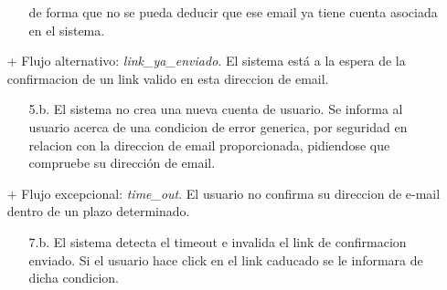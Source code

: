 \documentclass[a4paper]{report}
\begin{document}
\begin{itemize}
\begin{itemize}
                    de forma que no se pueda deducir que ese email ya tiene cuenta asociada en el sistema.
                \end{itemize}
                \item[+] Flujo alternativo: \emph{link\_ya\_enviado}. El sistema est\'a a la espera de la confirmacion de un link valido en esta direccion de email.
                \begin{itemize}
                    \item[5.b.] El sistema no crea una nueva cuenta de usuario. Se informa al usuario acerca de una condicion de error \-{}generica, por seguridad\- en relacion
                    con la direccion de email proporcionada, pidiendose que compruebe su direcci\'on de email.
                \end{itemize}
                \item[+] Flujo excepcional: \emph{time\_out}. El usuario no confirma su direccion de e-mail dentro de un plazo determinado.
                \begin{itemize}
                    \item[7.b.] El sistema detecta el timeout e invalida el link de confirmacion enviado. Si el usuario hace click en el link caducado se le informara de dicha condicion.
                \end{itemize}
            \end{itemize}
\end{document}
